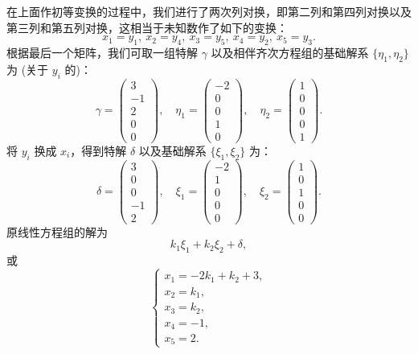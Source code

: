 \documentclass[UTF8,12pt,a4paper,fontset=fandol]{ctexart}
\begin{document}
在上面作初等变换的过程中，我们进行了两次列对换，即第二列和第四列对换以及第三列和第五列对换，这相当于未知数作了如下的变换：
\[
x_1=y_1,\ x_2=y_4,\ x_3=y_5,\ x_4=y_2,\ x_5=y_3.
\]
根据最后一个矩阵，我们可取一组特解 $\gamma$ 以及相伴齐次方程组的基础解系 $\{\eta_1,\eta_2\}$ 为 (关于 $y_i$ 的)：
\[
\gamma=\left(\begin{array}{r}
3\\
-1\\
2\\
0\\
0
\end{array}\right),\quad
\eta_1=\left(\begin{array}{r}
-2\\
0\\
0\\
1\\
0
\end{array}\right),\quad
\eta_2=\left(\begin{array}{r}
1\\
0\\
0\\
0\\
1
\end{array}\right).
\]
将 $y_i$ 换成 $x_i$，得到特解 $\delta$ 以及基础解系 $\{\xi_1,\xi_2\}$ 为：
\[
\delta=\left(\begin{array}{r}
3\\
0\\
0\\
-1\\
2
\end{array}\right),\quad
\xi_1=\left(\begin{array}{r}
-2\\
1\\
0\\
0\\
0
\end{array}\right),\quad
\xi_2=\left(\begin{array}{r}
1\\
0\\
1\\
0\\
0
\end{array}\right).
\]
原线性方程组的解为
\[
k_1\xi_1+k_2\xi_2+\delta,
\]
或
\[
\left\{\begin{array}{l}
x_1=-2k_1+k_2+3,\\
x_2=k_1,\\
x_3=k_2,\\
x_4=-1,\\
x_5=2.
\end{array}\right.
\]
\end{document}
